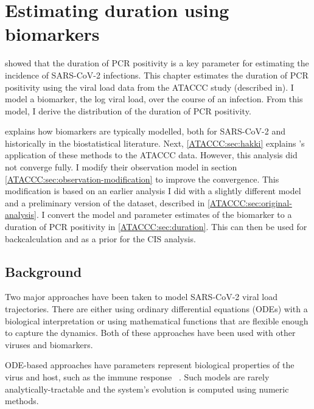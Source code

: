\documentclass[thesis.tex]{subfiles}
\begin{document}
\ifSubfilesClassLoaded{
  \setcounter{chapter}{4}
}

\chapter{Estimating duration using biomarkers} \label{ATACCC}

 showed that the duration of PCR positivity is a key parameter for estimating the incidence of SARS-CoV-2 infections.
This chapter estimates the duration of PCR positivity using the viral load data from the ATACCC study (described in).
I model a biomarker, the log viral load, over the course of an infection.
From this model, I derive the distribution of the duration of PCR positivity.

 explains how biomarkers are typically modelled, both for SARS-CoV-2 and historically in the biostatistical literature.
Next, \cref{ATACCC:sec:hakki} explains \textcite{hakkiOnset}'s application of these methods to the ATACCC data.
However, this analysis did not converge fully.
I modify their observation model in section \cref{ATACCC:sec:observation-modification} to improve the convergence.
This modification is based on an earlier analysis I did with a slightly different model and a preliminary version of the dataset, described in \cref{ATACCC:sec:original-analysis}.
I convert the model and parameter estimates of the biomarker to a duration of PCR positivity in \cref{ATACCC:sec:duration}.
This can then be used for backcalculation and as a prior for the CIS analysis.

\section{Background} \label{ATACCC:sec:background}

Two major approaches have been taken to model SARS-CoV-2 viral load trajectories.
There are either using ordinary differential equations (ODEs) with a biological interpretation or using mathematical functions that are flexible enough to capture the dynamics.
Both of these approaches have been used with other viruses and biomarkers.

ODE-based approaches have parameters represent biological properties of the virus and host, such as the immune response ~\autocites[e.g.:][]{ejimaEstimation,keVivo,kimQuantitative,goncalvesTiming,perelsonMechanistic}.
Such models are rarely analytically-tractable and the system's evolution is computed using numeric methods.
\end{document}
